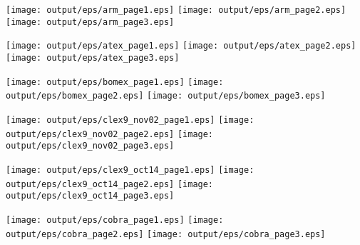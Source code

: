 \documentclass[11pt]{article}
\author{Larson Group, UW-Milwaukee}
\begin{document}
\begin{center}

\texttt{[image: output/eps/arm\_page1.eps]}
\texttt{[image: output/eps/arm\_page2.eps]}
\texttt{[image: output/eps/arm\_page3.eps]}
\end{center}
\newpage

\begin{center}

\texttt{[image: output/eps/atex\_page1.eps]}
\texttt{[image: output/eps/atex\_page2.eps]}
\texttt{[image: output/eps/atex\_page3.eps]}
\end{center}
\newpage


\begin{center}

\texttt{[image: output/eps/bomex\_page1.eps]}
\texttt{[image: output/eps/bomex\_page2.eps]}
\texttt{[image: output/eps/bomex\_page3.eps]}
\end{center}
\newpage

\begin{center}

\texttt{[image: output/eps/clex9\_nov02\_page1.eps]}
\texttt{[image: output/eps/clex9\_nov02\_page2.eps]}
\texttt{[image: output/eps/clex9\_nov02\_page3.eps]}
\end{center}
\newpage

\begin{center}

\texttt{[image: output/eps/clex9\_oct14\_page1.eps]}
\texttt{[image: output/eps/clex9\_oct14\_page2.eps]}
\texttt{[image: output/eps/clex9\_oct14\_page3.eps]}
\end{center}
\newpage

\begin{center}

\texttt{[image: output/eps/cobra\_page1.eps]}
\texttt{[image: output/eps/cobra\_page2.eps]}
\texttt{[image: output/eps/cobra\_page3.eps]}
\end{center}
\newpage
\end{document}

